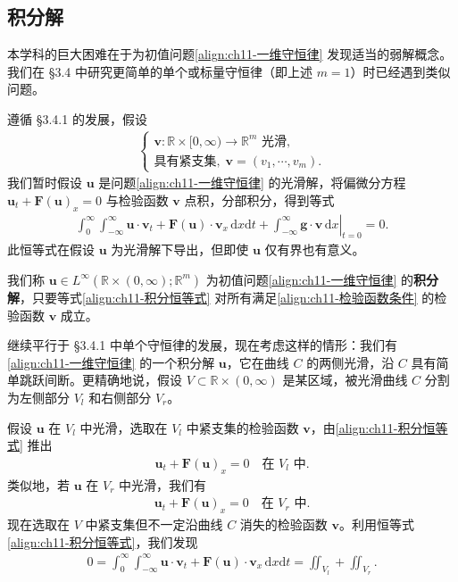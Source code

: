 \documentclass[../../main.tex]{subfiles}
\begin{document}
\subsection{积分解}\label{subsection:ch11-积分解}

本学科的巨大困难在于为初值问题\eqref{align:ch11-一维守恒律} 发现适当的弱解概念。我们在 \S3.4 中研究更简单的单个或标量守恒律（即上述 $m=1$）时已经遇到类似问题。

遵循 \S3.4.1 的发展，假设
\begin{align}
\begin{cases}
\mathbf{v}:\mathbb{R}\times[0,\infty)\to\mathbb{R}^m \text{ 光滑},\\
\text{具有紧支集},\;\mathbf{v}=(v_1,\cdots,v_m).
\end{cases}
\label{align:ch11-检验函数条件}
\end{align}
我们暂时假设 $\mathbf{u}$ 是问题\eqref{align:ch11-一维守恒律} 的光滑解，将偏微分方程 $\mathbf{u}_t+\mathbf{F}(\mathbf{u})_x=0$ 与检验函数 $\mathbf{v}$ 点积，分部积分，得到等式
\begin{align}
\int_0^\infty\int_{-\infty}^\infty \mathbf{u}\cdot\mathbf{v}_t+\mathbf{F}(\mathbf{u})\cdot\mathbf{v}_x\,\mathrm{d}x\mathrm{d}t+\left.\int_{-\infty}^\infty\mathbf{g}\cdot\mathbf{v}\,\mathrm{d}x\right|_{t=0}=0.
\label{align:ch11-积分恒等式}
\end{align}
此恒等式在假设 $\mathbf{u}$ 为光滑解下导出，但即使 $\mathbf{u}$ 仅有界也有意义。

\begin{definition}\label{definition:ch11-积分解}
我们称 $\mathbf{u}\in L^\infty(\mathbb{R}\times(0,\infty);\mathbb{R}^m)$ 为初值问题\eqref{align:ch11-一维守恒律} 的\textbf{积分解}，只要等式\eqref{align:ch11-积分恒等式} 对所有满足\eqref{align:ch11-检验函数条件} 的检验函数 $\mathbf{v}$ 成立。
\end{definition}

继续平行于 \S3.4.1 中单个守恒律的发展，现在考虑这样的情形：我们有\eqref{align:ch11-一维守恒律} 的一个积分解 $\mathbf{u}$，它在曲线 $C$ 的两侧光滑，沿 $C$ 具有简单跳跃间断。更精确地说，假设 $V\subset\mathbb{R}\times(0,\infty)$ 是某区域，被光滑曲线 $C$ 分割为左侧部分 $V_l$ 和右侧部分 $V_r$。

假设 $\mathbf{u}$ 在 $V_l$ 中光滑，选取在 $V_l$ 中紧支集的检验函数 $\mathbf{v}$，由\eqref{align:ch11-积分恒等式} 推出
\begin{align}
\mathbf{u}_t+\mathbf{F}(\mathbf{u})_x=0 \quad \text{在 } V_l \text{ 中}.
\label{align:ch11-VL方程}
\end{align}
类似地，若 $\mathbf{u}$ 在 $V_r$ 中光滑，我们有
\begin{align}
\mathbf{u}_t+\mathbf{F}(\mathbf{u})_x=0 \quad \text{在 } V_r \text{ 中}.
\label{align:ch11-VR方程}
\end{align}
现在选取在 $V$ 中紧支集但不一定沿曲线 $C$ 消失的检验函数 $\mathbf{v}$。利用恒等式\eqref{align:ch11-积分恒等式}，我们发现
\begin{align}
0=\int_0^\infty\int_{-\infty}^\infty \mathbf{u}\cdot\mathbf{v}_t+\mathbf{F}(\mathbf{u})\cdot\mathbf{v}_x\,\mathrm{d}x\mathrm{d}t=\iint_{V_l}+\iint_{V_r}.
\label{align:ch11-分部积分}
\end{align}
\end{document}
